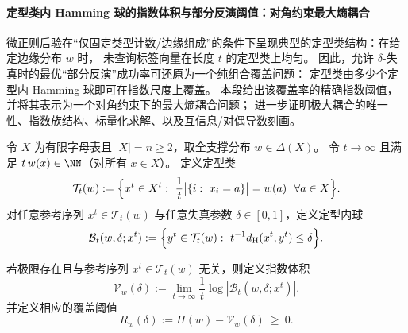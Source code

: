 
\paragraph{定型类内 Hamming 球的指数体积与部分反演阈值：对角约束最大熵耦合}
微正则后验在“仅固定类型计数/边缘组成”的条件下呈现典型的定型类结构：在给定边缘分布 \(w\) 时，
未查询标签向量在长度 \(t\) 的定型类上均匀。
因此，允许 \(\delta\)-失真时的最优“部分反演”成功率可还原为一个纯组合覆盖问题：
定型类由多少个定型内 Hamming 球即可在指数尺度上覆盖。
本段给出该覆盖率的精确指数阈值，并将其表示为一个对角约束下的最大熵耦合问题；
进一步证明极大耦合的唯一性、指数族结构、标量化求解、以及互信息/对偶导数刻画。

\begin{definition}\label{def:pom-typeclass-and-hamming-ball}
令 \(X\) 为有限字母表且 \(|X|=n\ge 2\)，取全支撑分布 \(w\in\Delta(X)\)。
令 \(t\to\infty\) 且满足 \(t\,w(x)\in\NN\)（对所有 \(x\in X\)）。
定义定型类
\[
\mathcal T_t(w):=\Bigl\{x^t\in X^t:\ \frac{1}{t}\bigl|\{i:\ x_i=a\}\bigr|=w(a)\ \ \forall a\in X\Bigr\}.
\]
对任意参考序列 \(x^t\in\mathcal T_t(w)\) 与任意失真参数 \(\delta\in[0,1]\)，定义定型内球
\[
\mathcal B_t(w,\delta;x^t):=\Bigl\{y^t\in\mathcal T_t(w):\ t^{-1}d_{\rm H}(x^t,y^t)\le \delta\Bigr\}.
\]
\end{definition}

\begin{definition}[指数体积与覆盖阈值]\label{def:pom-typeclass-volume-and-threshold}
若极限存在且与参考序列 \(x^t\in\mathcal T_t(w)\) 无关，则定义指数体积
\[
\mathcal V_w(\delta):=\lim_{t\to\infty}\frac{1}{t}\log|\mathcal B_t(w,\delta;x^t)|.
\]
并定义相应的覆盖阈值
\[
R_w(\delta):=H(w)-\mathcal V_w(\delta)\ \ge\ 0.
\]
\end{definition}

